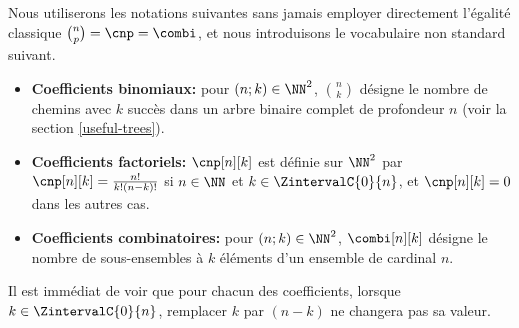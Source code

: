 Nous utiliserons les notations suivantes sans jamais employer directement l'égalité classique $\binom{n}{p} = \cnp = \combi$,
et nous introduisons le vocabulaire non standard suivant.
%
\begin{itemize}
	\item \textbf{Coefficients binomiaux:}
    pour $(n;k) \in \NN^2$,
    $\binom{n}{k}$ désigne le nombre de chemins avec $k$ succès dans un arbre binaire complet de profondeur $n$ (voir la section  \ref{useful-trees}).


	\item \textbf{Coefficients factoriels:}
    $\cnp[n][k]$ est définie sur $\NN^2$ par
	$\cnp[n][k] = \frac{n!}{k!(n-k)!}$ si $n \in \NN$ et $k \in \ZintervalC{0}{n}$,
	et
	$\cnp[n][k] = 0$ dans les autres cas.


	\item \textbf{Coefficients combinatoires:}
    pour $(n;k) \in \NN^2$,
    $\combi[n][k]$ désigne le nombre de sous-ensembles à $k$ éléments d'un ensemble de cardinal $n$.
\end{itemize}

Il est immédiat de voir que pour chacun des coefficients, lorsque $k \in \ZintervalC{0}{n}$, remplacer $k$ par $(n-k)$ ne changera pas sa valeur.